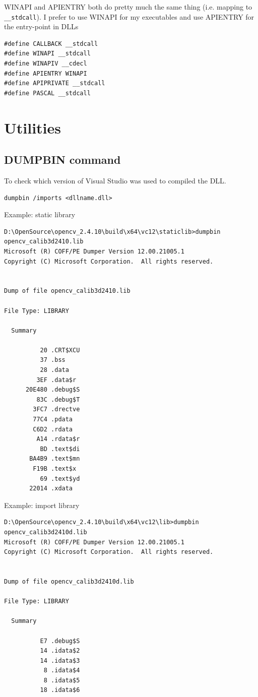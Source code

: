 WINAPI and APIENTRY both do pretty much the same thing (i.e. mapping to
\verb!__stdcall!). I prefer to use WINAPI for my executables and use APIENTRY
for the entry-point in DLLs

\begin{verbatim}
#define CALLBACK __stdcall
#define WINAPI __stdcall
#define WINAPIV __cdecl
#define APIENTRY WINAPI
#define APIPRIVATE __stdcall
#define PASCAL __stdcall
\end{verbatim}


\section{Utilities}

\subsection{DUMPBIN command}
\label{sec:dumpbin_command}


To check which version of Visual Studio was used to compiled the DLL.
\begin{verbatim}
dumpbin /imports <dllname.dll>
\end{verbatim}

Example: static library
\begin{verbatim}
D:\OpenSource\opencv_2.4.10\build\x64\vc12\staticlib>dumpbin opencv_calib3d2410.lib
Microsoft (R) COFF/PE Dumper Version 12.00.21005.1
Copyright (C) Microsoft Corporation.  All rights reserved.


Dump of file opencv_calib3d2410.lib

File Type: LIBRARY

  Summary

          20 .CRT$XCU
          37 .bss
          28 .data
         3EF .data$r
      20E480 .debug$S
         83C .debug$T
        3FC7 .drectve
        77C4 .pdata
        C6D2 .rdata
         A14 .rdata$r
          BD .text$di
       BA4B9 .text$mn
        F19B .text$x
          69 .text$yd
       22014 .xdata
\end{verbatim}


Example: import library
\begin{verbatim}
D:\OpenSource\opencv_2.4.10\build\x64\vc12\lib>dumpbin opencv_calib3d2410d.lib
Microsoft (R) COFF/PE Dumper Version 12.00.21005.1
Copyright (C) Microsoft Corporation.  All rights reserved.


Dump of file opencv_calib3d2410d.lib

File Type: LIBRARY

  Summary

          E7 .debug$S
          14 .idata$2
          14 .idata$3
           8 .idata$4
           8 .idata$5
          18 .idata$6
\end{verbatim}

